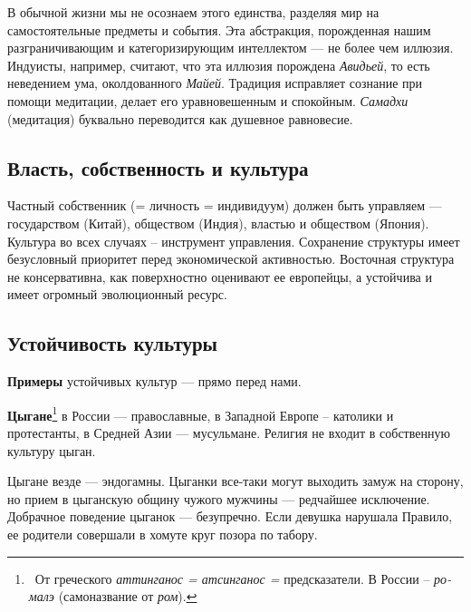 \documentclass[a4paper]{article}
\begin{document}
{
В обычной жизни мы не осознаем этого единства, разделяя мир на самостоятельные предметы и события. Эта абстракция,
порожденная нашим разграничивающим и категоризирующим интеллектом — не более чем иллюзия. Индуисты, например, считают,
что эта иллюзия порождена \textit{Авидьей}, то есть неведением ума, околдованного \textit{Майей}. Традиция
{\textquotedbl}исправляет{\textquotedbl} сознание при помощи медитации, делает его уравновешенным и спокойным.
\textit{Самадхи} (медитация) буквально переводится как {\textquotedbl}душевное равновесие{\textquotedbl}. }

\subsection[Власть, собственность и культура]{ Власть, собственность и культура}
{
Частный собственник (= личность = индивидуум) должен быть управляем — государством (Китай), обществом (Индия), властью и
обществом (Япония). Культура во всех случаях – инструмент управления. Сохранение структуры имеет безусловный приоритет
перед экономической активностью. Восточная структура не консервативна, как поверхностно оценивают ее европейцы, а
устойчива и имеет огромный эволюционный ресурс. }

\subsection[Устойчивость культуры]{ Устойчивость культуры}
{
\textbf{Примеры} устойчивых культур — прямо перед нами.}

{
\textbf{Цыгане}\footnote{\foreignlanguage{russian}{\ От греческого }\foreignlanguage{russian}{\textit{аттинганос =
атсинганос = }}\foreignlanguage{russian}{предсказатели. В России –}\foreignlanguage{russian}{\textit{
ромалэ}}\foreignlanguage{russian}{ (самоназвание от
}\foreignlanguage{russian}{\textit{ром}}\foreignlanguage{russian}{).}} в России — православные, в Западной Европе –
католики и протестанты, в Средней Азии — мусульмане. Религия не входит в собственную культуру цыган. }

{
Цыгане везде — эндогамны. Цыганки все-таки могут выходить замуж {\textquotedbl}на сторону{\textquotedbl}, но прием в
цыганскую общину {\textquotedbl}чужого{\textquotedbl} мужчины — редчайшее исключение. Добрачное поведение цыганок —
безупречно. Если девушка нарушала Правило, ее родители совершали в хомуте круг позора по табору.}
\end{document}
